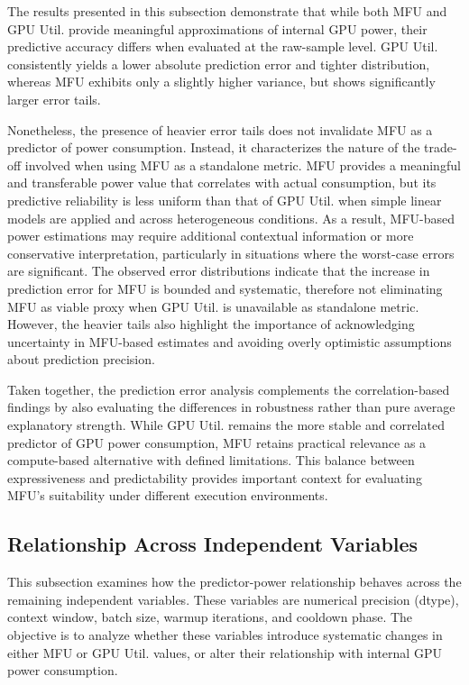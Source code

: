 \documentclass[runningheads]{llncs}
\begin{document}
The results presented in this subsection demonstrate that while both MFU and GPU Util. provide meaningful approximations of internal GPU power, their predictive accuracy differs when evaluated at the raw-sample level. GPU Util. consistently yields a lower absolute prediction error and tighter distribution, whereas MFU exhibits only a slightly higher variance, but shows significantly larger error tails.

Nonetheless, the presence of heavier error tails does not invalidate MFU as a predictor of power consumption. Instead, it characterizes the nature of the trade-off involved when using MFU as a standalone metric. MFU provides a meaningful and transferable power value that correlates with actual consumption, but its predictive reliability is less uniform than that of GPU Util. when simple linear models are applied and across heterogeneous conditions. As a result, MFU-based power estimations may require additional contextual information or more conservative interpretation, particularly in situations where the worst-case errors are significant.
The observed error distributions indicate that the increase in prediction error for MFU is bounded and systematic, therefore not eliminating MFU as viable proxy when GPU Util. is unavailable as standalone metric. However, the heavier tails also highlight the importance of acknowledging uncertainty in MFU-based estimates and avoiding overly optimistic assumptions about prediction precision.

Taken together, the prediction error analysis complements the correlation-based findings by also evaluating the differences in robustness rather than pure average explanatory strength. While GPU Util. remains the more stable and correlated predictor of GPU power consumption, MFU retains practical relevance as a compute-based alternative with defined limitations. This balance between expressiveness and predictability provides important context for evaluating MFU's suitability under different execution environments.

\subsection{Relationship Across Independent Variables}\label{Relationship Across Variables}
This subsection examines how the predictor-power relationship behaves across the remaining independent variables. These variables are numerical precision (dtype), context window, batch size, warmup iterations, and cooldown phase. The objective is to analyze whether these variables introduce systematic changes in either MFU or GPU Util. values, or alter their relationship with internal GPU power consumption.
\end{document}
